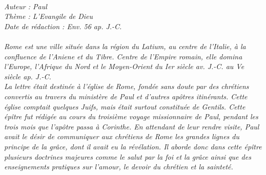\BFont
\noindent\hrulefill
{\footnotesize
\textit{
\bigskip
{\centering{}
\\Auteur : Paul
\\Thème : L'Evangile de Dieu
\\Date de rédaction : Env. 56 ap. J.-C.\\}
}
\textit{
\\Rome est une ville située dans la région du Latium, au centre de l'Italie, à la confluence de l'Aniene et du Tibre. Centre de l'Empire romain, elle domina l'Europe, l'Afrique du Nord et le Moyen-Orient du Ier siècle av. J.-C. au Ve siècle ap. J.-C.
\\La lettre était destinée à l'église de Rome, fondée sans doute par des chrétiens convertis au travers du ministère de Paul et d'autres apôtres itinérants. Cette église comptait quelques Juifs, mais était surtout constituée de Gentils. Cette
épître fut rédigée au cours du troisième voyage missionnaire de Paul, pendant les trois mois que l'apôtre passa à Corinthe.
En attendant de leur rendre visite, Paul avait le désir de communiquer aux chrétiens de Rome les grandes lignes du principe de la grâce, dont il avait eu la révélation. Il aborde donc dans cette épître plusieurs doctrines majeures comme le salut par la foi et la grâce ainsi que des enseignements pratiques sur l'amour, le devoir du chrétien et la sainteté.\bigskip
}
}
\par\nobreak\noindent\hrulefill
